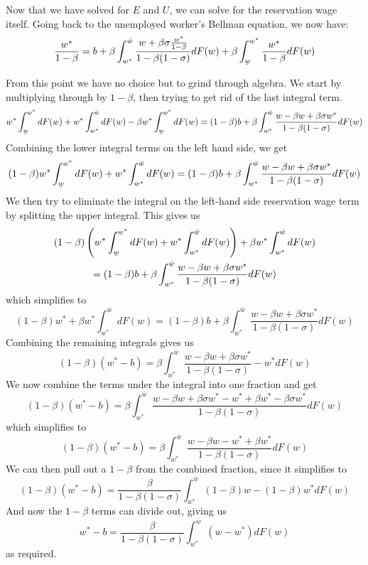 \documentclass[12pt, letterpaper, parskip = full]{article}
\newcommand{\ubar}[1]{\underaccent{\bar}{#1}}
\begin{document}
	Now that we have solved for \(E\) and \(U\), we can solve for the reservation wage itself. Going back to the unemployed worker's Bellman equation, we now have:
	\[ \frac{w^*}{1 - \beta} = b + \beta \int_{w^*}^{\bar{w}} \frac{w + \beta \sigma \frac{w^*}{1 - \beta}}{1 - \beta (1 - \sigma)} dF(w) + \beta \int_{\ubar{w}}^{w^*} \frac{w^*}{1-\beta} dF(w) \]

	From this point we have no choice but to grind through algebra. We start by multiplying through by \(1-\beta\), then trying to get rid of the last integral term.
	\[ w^* \int_{\ubar{w}}^{w^*} dF(w) + w^* \int_{w^*}^{\bar{w}} dF(w) - \beta w^* \int_{\ubar{w}}^{w^*} dF(w) = (1 - \beta) b + \beta \int_{w^*}^{\bar{w}} \frac{w - \beta w + \beta \sigma w^*}{1 - \beta (1 - \sigma)} dF(w) \]
	Combining the lower integral terms on the left hand side, we get
	\[ (1 - \beta) w^* \int_{\ubar{w}}^{w^*} dF(w) + w^* \int_{w^*}^{\bar{w}} dF(w) = (1-\beta) b + \beta \int_{w^*}^{\bar{w}} \frac{w - \beta w + \beta \sigma w^*}{1 - \beta (1 - \sigma)} dF(w)        \]
	We then try to eliminate the integral on the left-hand side reservation wage term by splitting the upper integral. This gives us
	\begin{multline*}
	(1-\beta) \left( w^* \int_{\ubar{w}}^{w^*} dF(w) + w^* \int_{w^*}^{\bar{w}} dF(w)    \right) + \beta w^* \int_{w^*}^{\bar{w}} dF(w) \\= (1-\beta) b + \beta \int_{w^*}^{\bar{w}} \frac{w - \beta w + \beta \sigma w^*}{1 - \beta (1 - \sigma)} dF(w)
	\end{multline*}
	which simplifies to
	\[ (1 - \beta) w^* + \beta w^* \int_{w^*}^{\bar{w}} dF(w)= (1 - \beta) b + \beta \int_{w^*}^{\bar{w}} \frac{w - \beta w + \beta \sigma w^*}{1 - \beta (1 - \sigma)} dF(w)        \]
	Combining the remaining integrals gives us
	\[ (1-\beta)(w^* - b) = \beta \int_{w^*}^{\bar{w}} \frac{w - \beta w + \beta \sigma w^*}{1 - \beta (1 - \sigma)} - w^*  dF(w)      \]
	We now combine the terms under the integral into one fraction and get
	\[ (1 - \beta)(w^* - b) = \beta \int_{w^*}^{\bar{w}} \frac{w - \beta w + \beta \sigma w^* - w^* + \beta w^* - \beta \sigma w^*}{1 - \beta (1 - \sigma)} dF(w)        \]
	which simplifies to
	\[ (1 - \beta) (w^* - b) = \beta \int_{w^*}^{\bar{w}} \frac{w - \beta w - w^* + \beta w^* }{1 - \beta (1 - \sigma)} dF(w)   \]
	We can then pull out a \(1-\beta\) from the combined fraction, since it simplifies to 
	\[ (1-\beta) (w^* - b) = \frac{\beta}{1 - \beta (1 - \sigma)} \int_{w^*}^{\bar{w}} (1-\beta) w - (1 - \beta) w^*   dF(w)    \]
	And now the \(1 - \beta\) terms can divide out, giving us
	\[ w^* - b = \frac{\beta}{1 - \beta (1 - \sigma)} \int_{w^*}^{\bar{w}} (w - w^*) dF(w)    \]
	as required.
\end{document}
